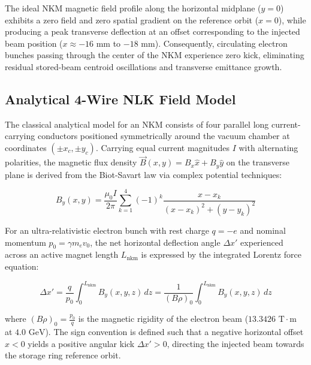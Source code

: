 \documentclass[11pt,a4paper]{article}
\begin{document}
The ideal NKM magnetic field profile along the horizontal midplane ($y=0$) exhibits a zero field and zero spatial gradient on the reference orbit ($x=0$), while producing a peak transverse deflection at an offset corresponding to the injected beam position ($x \approx -16\text{ mm}$ to $-18\text{ mm}$). Consequently, circulating electron bunches passing through the center of the NKM experience zero kick, eliminating residual stored-beam centroid oscillations and transverse emittance growth.

\subsection{Analytical 4-Wire NLK Field Model}
The classical analytical model for an NKM consists of four parallel long current-carrying conductors positioned symmetrically around the vacuum chamber at coordinates $(\pm x_c, \pm y_c)$. Carrying equal current magnitudes $I$ with alternating polarities, the magnetic flux density $\vec{B}(x,y) = B_x \hat{x} + B_y \hat{y}$ on the transverse plane is derived from the Biot-Savart law via complex potential techniques:

\begin{equation}
B_y(x,y) = \frac{\mu_0 I}{2\pi} \sum_{k=1}^{4} (-1)^{k} \frac{x - x_k}{(x - x_k)^2 + (y - y_k)^2}
\end{equation}

For an ultra-relativistic electron bunch with rest charge $q = -e$ and nominal momentum $p_0 = \gamma m_e v_0$, the net horizontal deflection angle $\Delta x'$ experienced across an active magnet length $L_{\text{nkm}}$ is expressed by the integrated Lorentz force equation:

\begin{equation}
\Delta x' = \frac{q}{p_0} \int_{0}^{L_{\text{nkm}}} B_y(x,y,z) \, dz = \frac{1}{(B\rho)_0} \int_{0}^{L_{\text{nkm}}} B_y(x,y,z) \, dz
\end{equation}

where $(B\rho)_0 = \frac{p_0}{q}$ is the magnetic rigidity of the electron beam ($13.3426\text{ T}\cdot\text{m}$ at $4.0\text{ GeV}$). The sign convention is defined such that a negative horizontal offset $x < 0$ yields a positive angular kick $\Delta x' > 0$, directing the injected beam towards the storage ring reference orbit.
\end{document}

